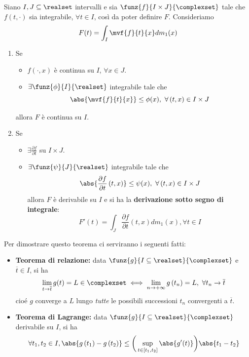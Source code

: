 \begin{theorema}
	Siano $I,J\subseteq\realset$ intervalli e sia $\funz{f}{I\times J}{\complexset}$ tale che $f\left(t,\cdot\right)$ sia integrabile, $\forall t\in I$, così da poter definire $F$. Consideriamo
	\begin{equation*}
		F(t)=\int_I\mvf{f}{t}{x}dm_1(x)
	\end{equation*}
	\begin{enumerate}
		\item Se
		\begin{itemize}
			\item $f\left(\cdot, x\right)$ è continua su $I$, $\forall x\in J$.
			\item $\exists \funz{\phi}{I}{\realset}$ integrabile tale che
			\begin{equation*}
				\abs{\mvf{f}{t}{x}}\leq\phi(x),\ \forall \left(t,x\right)\in I\times J
			\end{equation*}
		\end{itemize}
		allora $F$ è continua su $I$.
		\item Se
		\begin{itemize}
			\item $\exists\frac{\partial f}{\partial t}$ su $I\times J$.
			\item $\exists\funz{\psi}{J}{\realset}$ integrabile tale che
			\begin{equation*}
				\abs{\frac{\partial f}{\partial t}\left(t,x\right)}\leq\psi(x),\ \forall \left(t,x\right)\in I\times J
			\end{equation*}
			allora $F$ è derivabile su $I$ e si ha la \textbf{derivazione sotto segno di integrale}:
			\begin{equation*}
				F'(t)=\int_J\frac{\partial f}{\partial t}\left(t,x\right)dm_1(x), \forall t\in I
			\end{equation*}
		\end{itemize}
	\end{enumerate}
\end{theorema}
Per dimostrare questo teorema ci serviranno i seguenti fatti:
\begin{itemize}
	\item \textbf{Teorema di relazione:} data $\funz{g}{I\subseteq\realset}{\complexset}$ e $\overline{t}\in I$, si ha
	\begin{equation}
		\lim_{t\to\overline{t}}g(t)=L\in\complexset\iff\lim_{n\to+\infty}g\left(t_n\right)=L,\ \forall t_n\to\overline{t}
	\end{equation} cioé $g$ converge a $L$ lungo \textit{tutte} le possibili successioni $t_n$ convergenti a $\overline{t}$.
	\item \textbf{Teorema di Lagrange:} data $\funz{g}{I\subseteq\realset}{\complexset}$ derivabile su $I$, si ha
	\begin{equation}
		\forall t_1,t_2\in I, \abs{g\left(t_1\right)-g\left(t_2\right)}\leq \bigg(\sup_{t\in\left[t_1,t_2\right]}\abs{g'(t)} \bigg)\abs{t_1-t_2}
	\end{equation}
\end{itemize}
